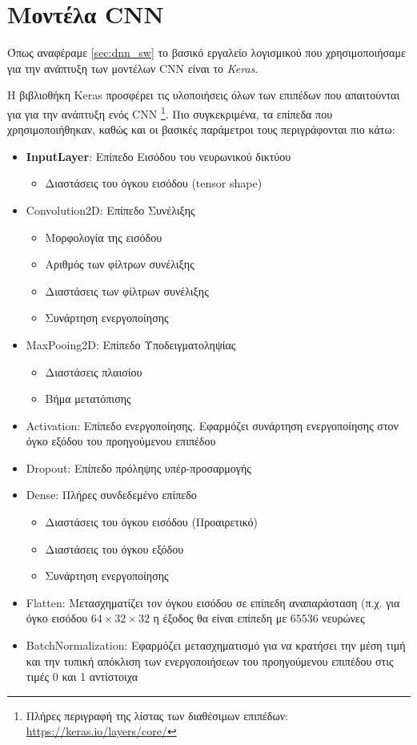 \section{Μοντέλα CNN}
\label{sec:cnn_impl}

Όπως αναφέραμε \autoref{sec:dnn_sw} το βασικό εργαλείο λογισμικού που
χρησιμοποιήσαμε για την ανάπτυξη των μοντέλων CNN είναι το \emph{Keras}.

Η βιβλιοθήκη Keras προσφέρει τις υλοποιήσεις όλων των επιπέδων που
απαιτούνται για για την ανάπτυξη ενός CNN
\footnote{Πλήρες περιγραφή της λίστας των διαθέσιμων επιπέδων: \href{https://keras.io/layers/core/}{https://keras.io/layers/core/}}.
Πιο συγκεκριμένα, τα επίπεδα που χρησιμοποιήθηκαν, καθώς και οι βασικές
παράμετροι τους περιγράφονται πιο κάτω:
\begin{itemize}
  \item{\textbf{InputLayer}: Επίπεδο Εισόδου του νευρωνικού δικτύου}
    \begin{itemize}
      \item{Διαστάσεις του όγκου εισόδου (tensor shape)}
    \end{itemize}
  \item{Convolution2D: Επίπεδο Συνέλιξης}
    \begin{itemize}
      \item{Μορφολογία της εισόδου}
      \item{Αριθμός των φίλτρων συνέλιξης}
      \item{Διαστάσεις των φίλτρων συνέλιξης}
      \item{Συνάρτηση ενεργοποίησης}
    \end{itemize}
  \item{MaxPooing2D: Επίπεδο Υποδειγματοληψίας}
    \begin{itemize}
      \item{Διαστάσεις πλαισίου}
      \item{Βήμα μετατόπισης}
    \end{itemize}
  \item{Activation: Επίπεδο ενεργοποίησης. Εφαρμόζει συνάρτηση ενεργοποίησης στον
    όγκο εξόδου του προηγούμενου επιπέδου}
  \item{Dropout: Επίπεδο πρόληψης υπέρ-προσαρμογής \cite{lecun2015deep}}
  \item{Dense: Πλήρες συνδεδεμένο επίπεδο}
    \begin{itemize}
      \item{Διαστάσεις του όγκου εισόδου (Προαιρετικό)}
      \item{Διαστάσεις του όγκου εξόδου}
      \item{Συνάρτηση ενεργοποίησης}
    \end{itemize}
  \item{Flatten: Μετασχηματίζει τον όγκου εισόδου σε επίπεδη αναπαράσταση
    (π.χ. για όγκο εισόδου $64 \times 32 \times 32$ η έξοδος θα είναι επίπεδη με $65536$ νευρώνες}
  \item{BatchNormalization: Εφαρμόζει μετασχηματισμό για να κρατήσει την μέση τιμή
      και την τυπική απόκλιση των ενεργοποιήσεων του προηγούμενου επιπέδου στις τιμές 0 και 1 αντίστοιχα}
\end{itemize}

